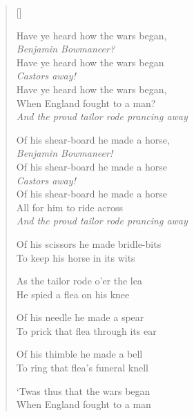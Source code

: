 \pagebreak
\settowidth{\versewidth}{Then t'worms'll come an' eyt thee up}
\begin{verse}[\versewidth]
\begin{patverse}
Have ye heard how the wars began,\\
\textit{Benjamin Bowmaneer?}\\
Have ye heard how the wars began\\
\textit{Castors away!}\\
Have ye heard how the wars began,\\
When England fought to a man?\\
\textit{And the proud tailor rode prancing away}
\end{patverse}

\begin{patverse}
Of his shear-board he made a horse,\\
\textit{Benjamin Bowmaneer!}\\
Of his shear-board he made a horse\\
\textit{Castors away!}\\
Of his shear-board he made a horse\\
All for him to ride across\\
\textit{And the proud tailor rode prancing away}
\end{patverse}

Of his scissors he made bridle-bits\\
To keep his horse in its wits

As the tailor rode o'er the lea\\
He spied a flea on his knee

Of his needle he made a spear\\
To prick that flea through its ear

Of his thimble he made a bell\\
To ring that flea's funeral knell

`Twas thus that the wars began\\
When England fought to a man
\end{verse}
